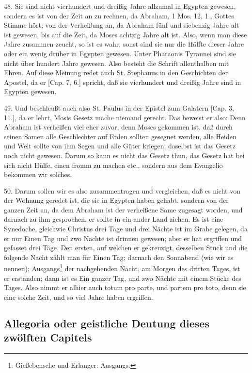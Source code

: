 48. Sie sind nicht vierhundert und dreißig Jahre allzumal in Egypten gewesen, sondern es ist von der Zeit an zu rechnen, da Abraham, 1 Mos. 12, 1., Gottes Stimme hört; von der Verheißung an, da Abraham fünf und siebenzig Jahre alt ist gewesen, bis auf die Zeit, da Moses achtzig Jahre alt ist. Also, wenn man diese Jahre zusammen zeucht, so ist es wahr; sonst sind sie nur die Hälfte dieser Jahre oder ein wenig drüber in Egypten gewesen. Unter Pharaonis Tyrannei sind sie nicht über hundert Jahre gewesen. Also besteht die Schrift allenthalben mit Ehren. Auf diese Meinung redet auch St. Stephanus in den Geschichten der Apostel, da er [Cap. 7, 6.] spricht, daß sie vierhundert und dreißig Jahre sind in Egypten gewesen.

49. Und beschleußt auch also St. Paulus in der Epistel zum Galatern [Cap. 3, 11.], da er lehrt, Mosis Gesetz mache niemand gerecht. Das beweist er also: Denn Abraham ist verheißen viel eher zuvor, denn Moses gekommen ist, daß durch seinen Samen alle Geschlechter auf Erden sollten gesegnet werden, alle Heiden und Welt sollte von ihm Segen und alle Güter kriegen; daselbst ist das Gesetz noch nicht gewesen. Darum so kann es nicht das Gesetz thun, das Gesetz hat bei sich nicht Hülfe, einen fromm zu machen etc., sondern aus dem Evangelio bekommen wir solches.

50. Darum sollen wir es also zusammentragen und vergleichen, daß es nicht von der Wohnung geredet ist, die sie in Egypten haben gehabt, sondern von der ganzen Zeit an, da dem Abraham ist der verheißene Same zugesagt worden, und darnach zu ihm gesprochen, er sollte in ein ander Land ziehen. Es ist eine Synedoche, gleichwie Christus drei Tage und drei Nächte ist im Grabe gelegen, da er nur Einen Tag und zwo Nächte ist drinnen gewesen; aber er hat ergriffen und gefasset drei Tage. Den ersten, auf welchen er gekreuzigt, desselben Stück und die folgende Nacht zählt man für Einen Tag; darnach den Sonnabend (wie wir es nennen); Ausgangs\footnote{Gießebensche und Erlanger: Ausgangs.} der nachgehenden Nacht, am Morgen des dritten Tages, ist er erstanden; dann ist es Ein ganzer Tag, und zwo Nächte mit einem Stücke des Tages. Also nimmt er alhier auch totum pro parte, und partem pro toto, denn sie eine solche Zeit, und so viel Jahre haben ergriffen.

\subsection{Allegoria oder geistliche Deutung dieses zwölften Capitels}


